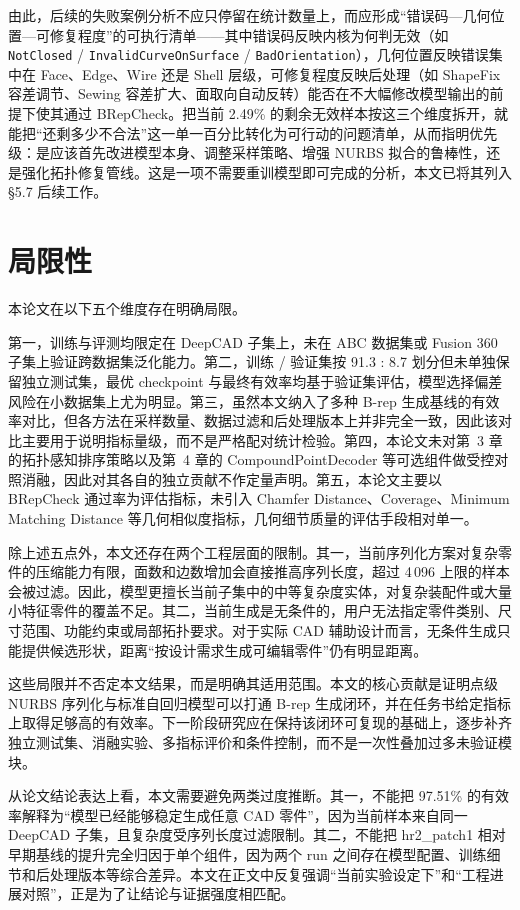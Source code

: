 由此，后续的失败案例分析不应只停留在统计数量上，而应形成“错误码—几何位置—可修复程度”的可执行清单——其中错误码反映内核为何判无效（如 \texttt{NotClosed} / \texttt{InvalidCurveOnSurface} / \texttt{BadOrientation}），几何位置反映错误集中在 Face、Edge、Wire 还是 Shell 层级，可修复程度反映后处理（如 ShapeFix 容差调节、Sewing 容差扩大、面取向自动反转）能否在不大幅修改模型输出的前提下使其通过 BRepCheck。把当前 2.49\% 的剩余无效样本按这三个维度拆开，就能把“还剩多少不合法”这一单一百分比转化为可行动的问题清单，从而指明优先级：是应该首先改进模型本身、调整采样策略、增强 NURBS 拟合的鲁棒性，还是强化拓扑修复管线。这是一项不需要重训模型即可完成的分析，本文已将其列入 §5.7 后续工作。

\section{局限性}

本论文在以下五个维度存在明确局限。

第一，训练与评测均限定在 DeepCAD 子集上，未在 ABC 数据集或 Fusion 360 子集上验证跨数据集泛化能力。第二，训练 / 验证集按 91.3 : 8.7 划分但未单独保留独立测试集，最优 checkpoint 与最终有效率均基于验证集评估，模型选择偏差风险在小数据集上尤为明显。第三，虽然本文纳入了多种 B-rep 生成基线的有效率对比，但各方法在采样数量、数据过滤和后处理版本上并非完全一致，因此该对比主要用于说明指标量级，而不是严格配对统计检验。第四，本论文未对第~3 章的拓扑感知排序策略以及第~4 章的 CompoundPointDecoder 等可选组件做受控对照消融，因此对其各自的独立贡献不作定量声明。第五，本论文主要以 BRepCheck 通过率为评估指标，未引入 Chamfer Distance、Coverage、Minimum Matching Distance 等几何相似度指标，几何细节质量的评估手段相对单一。

除上述五点外，本文还存在两个工程层面的限制。其一，当前序列化方案对复杂零件的压缩能力有限，面数和边数增加会直接推高序列长度，超过 4\,096 上限的样本会被过滤。因此，模型更擅长当前子集中的中等复杂度实体，对复杂装配件或大量小特征零件的覆盖不足。其二，当前生成是无条件的，用户无法指定零件类别、尺寸范围、功能约束或局部拓扑要求。对于实际 CAD 辅助设计而言，无条件生成只能提供候选形状，距离“按设计需求生成可编辑零件”仍有明显距离。

这些局限并不否定本文结果，而是明确其适用范围。本文的核心贡献是证明点级 NURBS 序列化与标准自回归模型可以打通 B-rep 生成闭环，并在任务书给定指标上取得足够高的有效率。下一阶段研究应在保持该闭环可复现的基础上，逐步补齐独立测试集、消融实验、多指标评价和条件控制，而不是一次性叠加过多未验证模块。

从论文结论表达上看，本文需要避免两类过度推断。其一，不能把 97.51\% 的有效率解释为“模型已经能够稳定生成任意 CAD 零件”，因为当前样本来自同一 DeepCAD 子集，且复杂度受序列长度过滤限制。其二，不能把 hr2\_patch1 相对早期基线的提升完全归因于单个组件，因为两个 run 之间存在模型配置、训练细节和后处理版本等综合差异。本文在正文中反复强调“当前实验设定下”和“工程进展对照”，正是为了让结论与证据强度相匹配。

